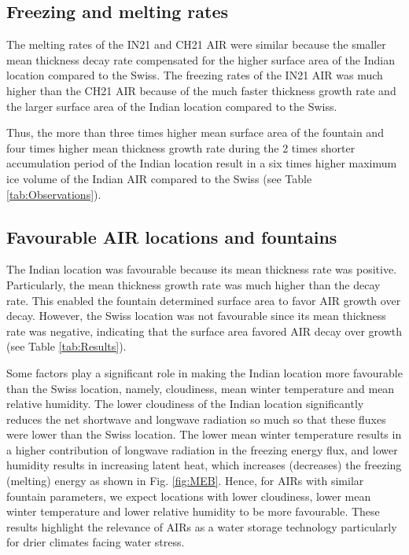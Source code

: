 \documentclass[utf8]{frontiersSCNS} %
\begin{document}
\subsection{Freezing and melting rates}

The melting rates of the IN21 and CH21 AIR were similar because the smaller mean thickness decay rate
compensated for the higher surface area of the Indian location compared to the Swiss. The freezing rates of the
IN21 AIR was much higher than the CH21 AIR because of the much faster thickness growth rate and the larger
surface area of the Indian location compared to the Swiss.

Thus, the more than three times higher mean surface area of the fountain and four times higher mean thickness
growth rate during the 2 times shorter accumulation period of the Indian location result in a six times
higher maximum ice volume of the Indian AIR compared to the Swiss (see Table \ref{tab:Observations}).

\subsection{Favourable AIR locations and fountains}

The Indian location was favourable because its mean thickness rate was positive. Particularly, the mean
thickness growth rate was much higher than the decay rate. This enabled the fountain determined surface area to
favor AIR growth over decay. However, the Swiss location was not favourable since its mean thickness rate was
negative, indicating that the surface area favored AIR decay over growth (see Table \ref{tab:Results}).

Some factors play a significant role in making the Indian location more favourable than the Swiss location,
namely, cloudiness, mean winter temperature and mean relative humidity. The lower cloudiness of the Indian
location significantly reduces the net shortwave and longwave radiation so much so that these fluxes were
lower than the Swiss location. The lower mean winter temperature results in a higher contribution of longwave
radiation in the freezing energy flux, and lower humidity results in increasing latent heat, which increases
(decreases) the freezing (melting) energy as shown in Fig. \ref{fig:MEB}. Hence, for AIRs with similar
fountain parameters, we expect locations with lower cloudiness, lower mean winter temperature and lower relative
humidity to be more favourable. These results highlight the relevance of AIRs as a water storage technology
particularly for drier climates facing water stress.
\end{document}
